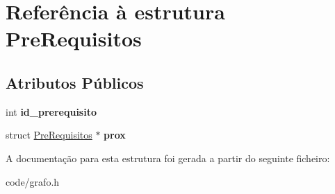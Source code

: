 \hypertarget{structPreRequisitos}{\section{Referência à estrutura Pre\-Requisitos}
\label{structPreRequisitos}
}
\subsection*{Atributos Públicos}
\begin{DoxyCompactItemize}
\item 
\hypertarget{structPreRequisitos_aac895640418edfa91ba7c8f01b91459e}{int {\bfseries id\-\_\-prerequisito}}\label{structPreRequisitos_aac895640418edfa91ba7c8f01b91459e}

\item 
\hypertarget{structPreRequisitos_ad30378886dd7fba5247ad1c77fb395f1}{struct \hyperlink{structPreRequisitos}{Pre\-Requisitos} $\ast$ {\bfseries prox}}\label{structPreRequisitos_ad30378886dd7fba5247ad1c77fb395f1}

\end{DoxyCompactItemize}


A documentação para esta estrutura foi gerada a partir do seguinte ficheiro\-:\begin{DoxyCompactItemize}
\item 
code/grafo.\-h\end{DoxyCompactItemize}
